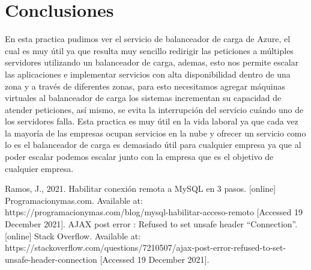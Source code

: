 \documentclass[11pt]{article}
\begin{document}
	\section{Conclusiones}
	En esta practica pudimos ver el servicio de balanceador de carga de Azure, el cual es muy útil ya que resulta muy sencillo redirigir las peticiones a múltiples servidores utilizando un balanceador de carga, ademas, esto nos permite escalar las aplicaciones e implementar servicios con alta disponibilidad dentro de una zona y a través de diferentes zonas, para esto necesitamos agregar máquinas virtuales al balanceador de carga los sistemas incrementan su capacidad de atender peticiones, así mismo, se evita la interrupción del servicio cuándo uno de los servidores falla. Esta practica es muy útil en la vida laboral ya que cada vez la mayoría de las empresas ocupan servicios en la nube y ofrecer un servicio como lo es el balanceador de carga es demasiado útil para cualquier empresa ya que al poder escalar podemos escalar junto con la empresa que es el objetivo de cualquier empresa.
			\begin{thebibliography}{1}
  Ramos, J., 2021. Habilitar conexión remota a MySQL en 3 pasos. [online] Programacionymas.com. Available at: https://programacionymas.com/blog/mysql-habilitar-acceso-remoto [Accessed 19 December 2021].
   AJAX post error : Refused to set unsafe header ``Connection''. [online] Stack Overflow. Available at: https://stackoverflow.com/questions/7210507/ajax-post-error-refused-to-set-unsafe-header-connection [Accessed 19 December 2021].
\end{thebibliography}
\end{document}
